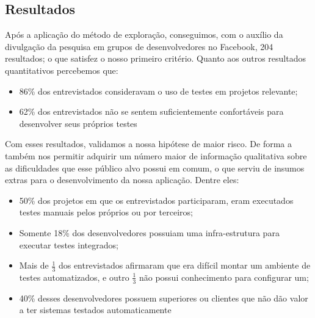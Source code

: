 \subsection {Resultados}
Após a aplicação do método de exploração, conseguimos, com o auxílio da divulgação da pesquisa em grupos de desenvolvedores no Facebook, 204 resultados; o que satisfez o nosso primeiro critério. Quanto aos outros resultados quantitativos percebemos que:

\begin{itemize}
\item 86\% dos entrevistados consideravam o uso de testes em projetos relevante;
\item 62\% dos entrevistados não se sentem suficientemente confortáveis para desenvolver seus próprios testes
\end{itemize}

Com esses resultados, validamos a nossa hipótese de maior risco. De forma a também nos permitir adquirir um número maior de informação qualitativa sobre as dificuldades que esse público alvo possui em comum, o que serviu de insumos extras para o desenvolvimento da nossa aplicação. Dentre eles:

\begin{itemize}
\item 50\% dos projetos em que os entrevistados participaram, eram executados testes manuais pelos próprios ou por terceiros;
\item Somente 18\% dos desenvolvedores possuiam uma infra-estrutura para executar testes integrados;
\item Mais de $\frac{1}{3}$ dos entrevistados afirmaram que era difícil montar um ambiente de testes automatizados, e outro $\frac{1}{3}$ não possui conhecimento para configurar um;
\item 40\% desses desenvolvedores possuem superiores ou clientes que não dão valor a ter sistemas testados automaticamente  
\end{itemize}

